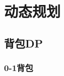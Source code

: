 \documentclass[a4paper, twoside]{article}
\begin{document}




    



\newpage
\section{动态规划}
\subsection{背包DP}
    \subsubsection{0-1背包}
\end{document}
